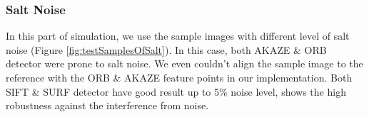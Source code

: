 		\subsubsection{Salt Noise}
		In this part of simulation, we use the sample images with different level of salt noise (Figure \ref{fig:testSamplesOfSalt}).
		In this case, both AKAZE \& ORB detector were prone to salt noise. 
		We even couldn't align the sample image to the reference with the ORB \& AKAZE feature points in our implementation.
		Both SIFT \& SURF detector have good result up to 5\% noise level, shows the high robustness against the interference from noise.
		\begin{figure}[H]

\end{figure}
